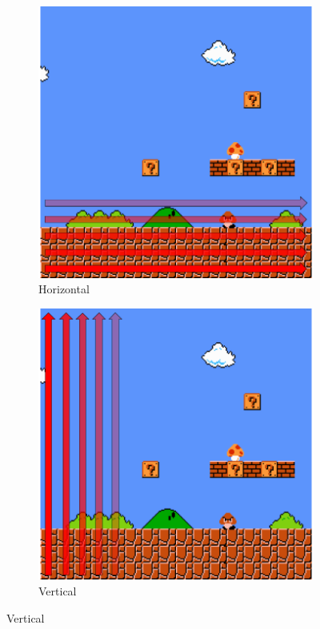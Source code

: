 \documentclass[a4paper]{article}
\begin{document}
\begin{figure}[ht]
\centering
    \begin{subfigure}[t]{0.18\textwidth}
    \centering
    \includegraphics[width=1\textwidth]{figures/Naive.png} 		       \caption{Horizontal}
    \label{fig:naive}
    \end{subfigure}
    \begin{subfigure}[t]{0.18\textwidth}
    \includegraphics[width=1\textwidth]{figures/BottomToTop.png} 	       \caption{Vertical}

\end{subfigure}
\end{figure}
\end{document}
